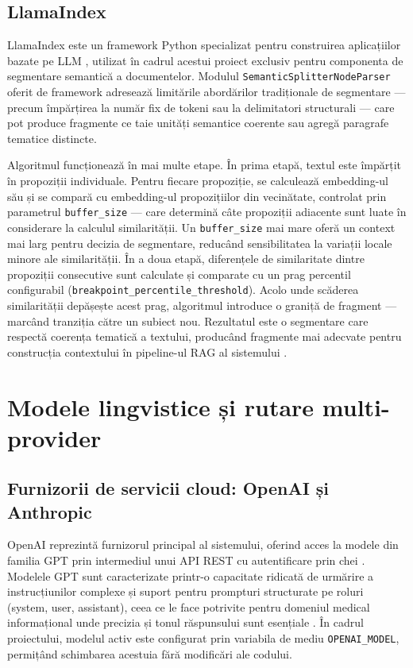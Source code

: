 \documentclass[12pt, a4paper, oneside, romanian]{teza-upb}
\begin{document}
\subsection{LlamaIndex}

LlamaIndex este un framework Python specializat pentru construirea aplicațiilor 
bazate pe LLM \cite{llamaindex_doc}, utilizat în cadrul acestui proiect exclusiv 
pentru componenta de segmentare semantică a documentelor. Modulul 
\texttt{SemanticSplitterNodeParser} oferit de framework adresează limitările 
abordărilor tradiționale de segmentare — precum împărțirea la număr fix de 
tokeni sau la delimitatori structurali — care pot produce fragmente ce taie 
unități semantice coerente sau agregă paragrafe tematice distincte.

Algoritmul funcționează în mai multe etape. În prima etapă, textul este împărțit 
în propoziții individuale. Pentru fiecare propoziție, se calculează embedding-ul 
său și se compară cu embedding-ul propozițiilor din vecinătate, controlat prin 
parametrul \texttt{buffer\_size} — care determină câte propoziții adiacente sunt 
luate în considerare la calculul similarității. Un \texttt{buffer\_size} mai mare 
oferă un context mai larg pentru decizia de segmentare, reducând sensibilitatea 
la variații locale minore ale similarității. În a doua etapă, diferențele de 
similaritate dintre propoziții consecutive sunt calculate și comparate cu un prag 
percentil configurabil (\texttt{breakpoint\_percentile\_threshold}). Acolo unde 
scăderea similarității depășește acest prag, algoritmul introduce o graniță de 
fragment — marcând tranziția către un subiect nou. Rezultatul este o segmentare 
care respectă coerența tematică a textului, producând fragmente mai adecvate 
pentru construcția contextului în pipeline-ul RAG al sistemului \cite{llamaindex_doc}.

\section{Modele lingvistice și rutare multi-provider}


\subsection{Furnizorii de servicii cloud: OpenAI și Anthropic}

OpenAI reprezintă furnizorul principal al sistemului, oferind acces la modele 
din familia GPT prin intermediul unui API REST cu autentificare prin chei 
\cite{openai_api}. Modelele GPT sunt caracterizate printr-o capacitate ridicată 
de urmărire a instrucțiunilor complexe și suport pentru prompturi structurate 
pe roluri (system, user, assistant), ceea ce le face potrivite pentru domeniul 
medical informațional unde precizia și tonul răspunsului sunt esențiale 
\cite{openai_api}. În cadrul proiectului, modelul activ este configurat prin 
variabila de mediu \texttt{OPENAI\_MODEL}, permițând schimbarea acestuia fără 
modificări ale codului.
\end{document}
